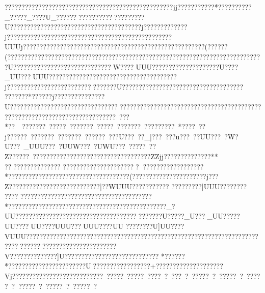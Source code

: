 {{{{{{{{{{{{{{{{{{{{{{{{{{{{{{{{{{{{{{{{{{{{{{{{{{{{{{{{{{{{{{{{{{{{{{{{{{{{{{{{{{{{{{{{{{{{{{{{{{{{{{{{{{{{{{{{{{{{{{{{{{{{{{{{{{{{{{{{{{{{{{{{{{{{{{{{{{{{{{{{{{{{{{{{{{{{{{{{{{{{{{{{{{{{{{{{{{{{{{{{{{{{{{{{{{{{{{{{{{{{{{{{{{{{{{{{{{{{{{{{{{{{{{{{{{{{{{{{{{{{{{{{{{{{{{{{{{{{{{{{{{{{{{{{{{{{{{{{{{{{{{{{{{{{{{{{{{{{{{{{{{{{{{{{{{{{{{{{{{{{{{{{{{{{{{{{{{{{{{{{{{{{{{{{{{{{{{{{{{{{{{{{{{{{{{{{{{{{{{{{{{{{{{{{{{{{{{{{{{{{{{{{{{{{{{{{{{{{{{{{{{{{{{{{{{{{{{{{{{{{{{{{{{{{{{{{{{{{{{{{{{{{{{{{{{{{{{{{{{{{{{{{{{{{{{{{{{{{{{{{{{{{{{{{{{{{{{{{{{{{{{{{{{{{{{{{{{{{{{{{{{{{{{{{{{{{{{{{{{{{{{{{{{{{{{{{{{{{{{{{{{{{{{{{{{{{{{{{{{{{{{{{{{{{{{{{{{{{{{{{{{{{{{{{{{{{{{{{{{{{{{{{{{{{{{{{{{{{{{{{{{{{{{{{{{{{{{{{{{{{{{{{{{{{{{{{{{{{{{{{{{{{{{{{{{{{{{{{{{{{{{{{{{{{{{{{{{{{{{{{{{{{{{{{{{{{{{{{{{{{{{{{{{{{{{{??????????????????????????????????????????????????jj???????????*????  ???? ??_?????_????U_??????  ???????????????????U???????????????????????????????????????j?????????????j?????????????????????????????????????????????????UUUj??    ?????  ???????????????   ???  ?????  ???? ????? ?????    ??    ????????   (???  ???  (????????????????????????????????????????????????????????????????????????????U?????????????????????????????W????UUU????????????????????U????_UU???UUU????    ????????????    ????   ????? ?????????????j????????????????????????????????}U????????????????????????????????????
??????? *??????j???????????????U???????????????????????????????????????????????????????????????????????????????????????????????????????????~???*??~~???????~?????~???????~?????~???????~?????????~*????~??j??????~???????~???????~??????~???U???~??_]???~???u???~??UU???~?W?U???~_UUU???~?UUW???~?UWU???~?????~??Z??????~???????????????????????????????????ZZjj??????????????** 
??   ??    ??    ??    ???   ????? ????????????????????????????????????????*????????????????????????????????????(??????????????????????j???Z???????????????????????????]??WUUU???????????
?????????]UUU????????
 ????  ???????????? ???????????????????????????*???????????????????????????????????????????????_?UU???????????????????????????????????????????U?????_U???_UU?????UU????UU????UUU???UUU????UU	 ????    ????U]UU????VUUU????   ???????  ??????  ??????? ??????????????????????????????????????? ??????????????????????????????????????V??????????????]U????????????????????????????
*??????*???????????????????????U?????????????????+????????????????????Vj???????????????????????????~?????~?????~????~?~???~?~?????~?~?????~?~?????~?~?????~?~?????~?~?????~?~
}}}}}}}}}}}}}}}}}}}}}}}}}}}}}}}}}}}}}}}}}}}}}}}}}}}}}}}}}}}}}}}}}}}}}}}}}}}}}}}}}}}}}}}}}}}}}}}}}}}}}}}}}}}}}}}}}}}}}}}}}}}}}}}}}}}}}}}}}}}}}}}}}}}}}}}}}}}}}}}}}}}}}}}}}}}}}}}}}}}}}}}}}}}}}}}}}}}}}}}}}}}}}}}}}}}}}}}}}}}}}}}}}}}}}}}}}}}}}}}}}}}}}}}}}}}}}}}}}}}}}}}}}}}}}}}}}}}}}}}}}}}}}}}}}}}}}}}}}}}}}}}}}}}}}}}}}}}}}}}}}}}}}}}}}}}}}}}}}}}}}}}}}}}}}}}}}}}}}}}}}}}}}}}}}}}}}}}}}}}}}}}}}}}}}}}}}}}}}}}}}}}}}}}}}}}}}}}}}}}}}}}}}}}}}}}}}}}}}}}}}}}}}}}}}}}}}}}}}}}}}}}}}}}}}}}}}}}}}}}}}}}}}}}}}}}}}}}}}}}}}}}}}}}}}}}}}}}}}}}}}}}}}}}}}}}}}}}}}}}}}}}}}}}}}}}}}}}}}}}}}}}}}}}}}}}}}}}}}}}}}}}}}}}}}}}}}}}}}}}}}}}}}}}}}}}}}}}}}}}}}}}}}}}}}}}}}}}}}}}}}}}}}}}}}}}}}}}}}}}}}}}}}}}}}}}}}}}}}}}}}}}}}}}}}}}}}}}}}}}}}}}}}}}}}}}}}}}}}}}}}}}}}}}}}}}}}}}}}}}}}}}}}}}}}}}}}}}}}}}}}}}}}}}}}}}}}}}}}}}}}}}}}}}}}}
